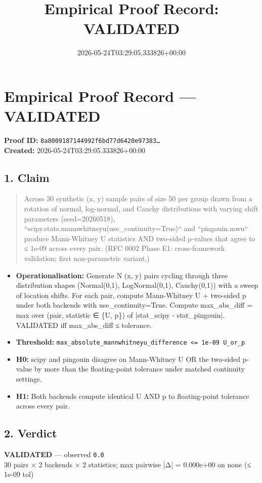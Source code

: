 \documentclass{article}
\title{Empirical Proof Record: VALIDATED}
\date{2026-05-24T03:29:05.333826+00:00}
\begin{document}
\maketitle
\section*{Empirical Proof Record --- \textcolor{validated}{\textbf{VALIDATED}}}
\textbf{Proof ID:} \texttt{8a8009187144992f6bd77d6420e97383\dots}\\
\textbf{Created:} 2026-05-24T03:29:05.333826+00:00
\subsection*{1. Claim}
\begin{quote}Across 30 synthetic (x, y) sample pairs of size 50 per group drawn from a rotation of normal, log-normal, and Cauchy distributions with varying shift parameters (seed=20260518), ``scipy.stats.mannwhitneyu(use\_continuity=True)`` and ``pingouin.mwu`` produce Mann-Whitney U statistics AND two-sided p-values that agree to ≤ 1e-09 across every pair. (RFC 0002 Phase E1: cross-framework validation; first non-parametric variant.)\end{quote}
\begin{itemize}
\item \textbf{Operationalisation:} Generate N (x, y) pairs cycling through three distribution shapes (Normal(0,1), LogNormal(0,1), Cauchy(0,1)) with a sweep of location shifts. For each pair, compute Mann-Whitney U + two-sided p under both backends with use\_continuity=True. Compute max\_abs\_diff = max over (pair, statistic ∈ \{U, p\}) of |stat\_scipy - stat\_pingouin|. VALIDATED iff max\_abs\_diff ≤ tolerance.
\item \textbf{Threshold:} \texttt{max\_absolute\_mannwhitneyu\_difference <= 1e-09 U\_or\_p}
\item \textbf{H0:} scipy and pingouin disagree on Mann-Whitney U OR the two-sided p-value by more than the floating-point tolerance under matched continuity settings.
\item \textbf{H1:} Both backends compute identical U AND p to floating-point tolerance across every pair.
\end{itemize}
\subsection*{2. Verdict}
\textcolor{validated}{\textbf{VALIDATED}} --- observed \texttt{0.0}\\
30 pairs × 2 backends × 2 statistics; max pairwise |Δ| = 0.000e+00 on none (≤ 1e-09 tol)
\end{document}
